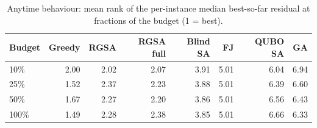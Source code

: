 \begin{table}[t]
\centering
\small
\caption{Anytime behaviour: mean rank of the per-instance median best-so-far residual at fractions of the budget (1 = best).}\label{tab:anytime}
\begin{tabular}{lrrrrrrr}
\toprule
Budget & Greedy & RGSA & RGSA full & Blind SA & FJ & QUBO SA & GA \\
\midrule
10\% & 2.00 & 2.02 & 2.07 & 3.91 & 5.01 & 6.04 & 6.94 \\
25\% & 1.52 & 2.37 & 2.23 & 3.88 & 5.01 & 6.39 & 6.60 \\
50\% & 1.67 & 2.27 & 2.20 & 3.86 & 5.01 & 6.56 & 6.43 \\
100\% & 1.49 & 2.28 & 2.38 & 3.85 & 5.01 & 6.66 & 6.33 \\
\bottomrule
\end{tabular}
\end{table}
